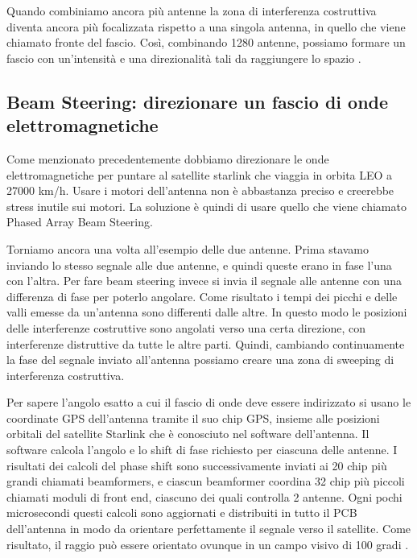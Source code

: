 Quando combiniamo ancora più antenne la zona di interferenza costruttiva diventa ancora più focalizzata rispetto a una singola antenna, in quello che viene chiamato fronte del fascio.
Così, combinando 1280 antenne, possiamo formare un fascio con un'intensità e una direzionalità tali da raggiungere lo spazio \cite{branch_education_how_2022}.

\subsection{Beam Steering: direzionare un fascio di onde elettromagnetiche}
Come menzionato precedentemente dobbiamo direzionare le onde elettromagnetiche per puntare al satellite starlink che viaggia in orbita \ac{LEO} a 27000 km/h.
Usare i motori dell'antenna non è abbastanza preciso e creerebbe stress inutile sui motori.
La soluzione è quindi di usare quello che viene chiamato Phased Array Beam Steering.

Torniamo ancora una volta all'esempio delle due antenne.
Prima stavamo inviando lo stesso segnale alle due antenne, e quindi queste erano in fase l'una con l'altra.
Per fare beam steering invece si invia il segnale alle antenne con una differenza di fase per poterlo angolare.
Come risultato i tempi dei picchi e delle valli emesse da un'antenna sono differenti dalle altre.
In questo modo le posizioni delle interferenze costruttive sono angolati verso una certa direzione, con interferenze distruttive da tutte le altre parti.
Quindi, cambiando continuamente la fase del segnale inviato all'antenna possiamo creare una zona di sweeping di interferenza costruttiva.

Per sapere l'angolo esatto a cui il fascio di onde deve essere indirizzato si usano le coordinate GPS dell'antenna tramite il suo chip GPS, insieme alle posizioni orbitali del satellite Starlink che è conosciuto nel software dell'antenna.
Il software calcola l'angolo e lo shift di fase richiesto per ciascuna delle antenne.
I risultati dei calcoli del phase shift sono successivamente inviati ai 20 chip più grandi chiamati beamformers, e ciascun beamformer coordina 32 chip più piccoli chiamati moduli di front end, ciascuno dei quali controlla 2 antenne.
Ogni pochi microsecondi questi calcoli sono aggiornati e distribuiti in tutto il PCB dell'antenna in modo da orientare perfettamente il segnale verso il satellite.
Come risultato, il raggio può essere orientato ovunque in un campo visivo di 100 gradi \cite{branch_education_how_2022}.